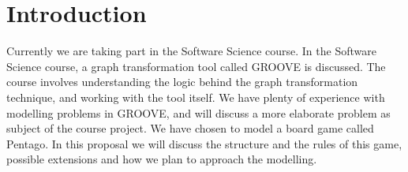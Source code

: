 \section{Introduction}
\label{Introduction}
Currently we are taking part in the Software Science course. In the Software Science course, a graph transformation tool called GROOVE is discussed. The course involves understanding the logic behind the graph transformation technique, and working with the tool itself. We have plenty of experience with modelling problems in GROOVE, and will discuss a more elaborate problem as subject of the course project. We have chosen to model a board game called Pentago. In this proposal we will discuss the structure and the rules of this game, possible extensions and how we plan to approach the modelling.